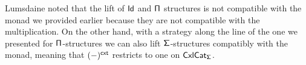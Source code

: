 
\begin{rmk}
  Lumsdaine noted that the lift of $\operatorname{\mathsf{Id}}$ and $\operatorname{\mathsf{\Pi}}$
  structures is not compatible with the monad we provided earlier because they
  are not compatible with the multiplication. On the other
  hand, with a strategy along the line of the one we presented for
  $\operatorname{\mathsf{\Pi}}$-structures we can also lift $\operatorname{\mathsf{\Sigma}}$-structures compatibly with the
  monad, meaning that $(-)^{\operatorname{\mathsf{cxt}}}$ restricts to one on $\operatorname{\mathsf{CxlCat}}_{\operatorname{\mathsf{\Sigma}}}$.
\end{rmk}
